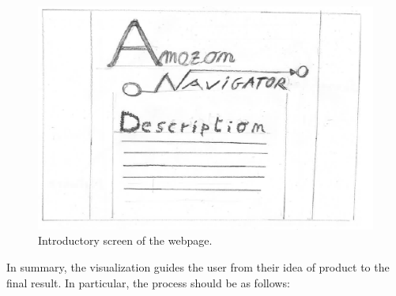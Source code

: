 \documentclass[a4paper,12pt]{article}
\begin{document}
\begin{figure}[H]
	\centering{}
	\includegraphics[width=\textwidth]{img/amazon.png}
	\caption{Introductory screen of the webpage.}
	\label{fig:amazon}
\end{figure}
In summary, the visualization guides the user from their idea of product to the final result. In particular, the process should be as follows:
\end{document}
